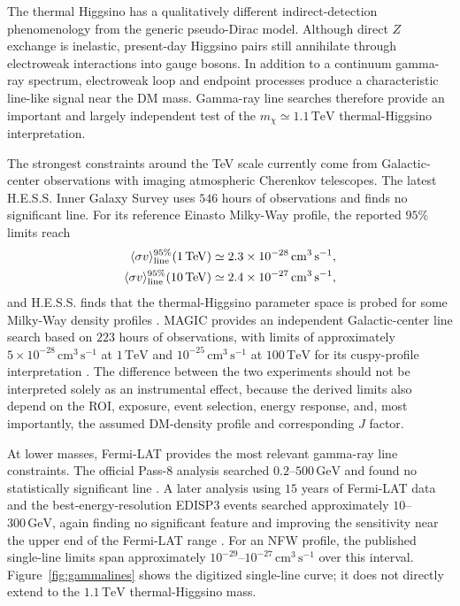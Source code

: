 \documentclass[aps,prd,reprint,superscriptaddress,nofootinbib,longbibliography,floatfix]{revtex4-2}
\newcommand{\GeV}{\mathrm{GeV}}
\newcommand{\TeV}{\mathrm{TeV}}
\begin{document}
The thermal Higgsino has a qualitatively different indirect-detection phenomenology from the generic pseudo-Dirac model. Although direct $Z$ exchange is inelastic, present-day Higgsino pairs still annihilate through electroweak interactions into gauge bosons. In addition to a continuum gamma-ray spectrum, electroweak loop and endpoint processes produce a characteristic line-like signal near the DM mass. Gamma-ray line searches therefore provide an important and largely independent test of the $m_\chi\simeq1.1\,\TeV$ thermal-Higgsino interpretation.

The strongest constraints around the TeV scale currently come from Galactic-center observations with imaging atmospheric Cherenkov telescopes. The latest H.E.S.S. Inner Galaxy Survey uses $546$ hours of observations and finds no significant line. For its reference Einasto Milky-Way profile, the reported $95\%$ limits reach
\begin{align}
\langle\sigma v\rangle_{\rm line}^{95\%}(1\,\TeV)
&\simeq2.3\times10^{-28}\,\mathrm{cm^3\,s^{-1}},\\
\langle\sigma v\rangle_{\rm line}^{95\%}(10\,\TeV)
&\simeq2.4\times10^{-27}\,\mathrm{cm^3\,s^{-1}},
\end{align}
and H.E.S.S. finds that the thermal-Higgsino parameter space is probed for some Milky-Way density profiles \cite{HESS2026}. MAGIC provides an independent Galactic-center line search based on $223$ hours of observations, with limits of approximately $5\times10^{-28}\,\mathrm{cm^3\,s^{-1}}$ at $1\,\TeV$ and $10^{-25}\,\mathrm{cm^3\,s^{-1}}$ at $100\,\TeV$ for its cuspy-profile interpretation \cite{MAGIC2023Lines}. The difference between the two experiments should not be interpreted solely as an instrumental effect, because the derived limits also depend on the ROI, exposure, event selection, energy response, and, most importantly, the assumed DM-density profile and corresponding $J$ factor.

At lower masses, Fermi-LAT provides the most relevant gamma-ray line constraints. The official Pass-8 analysis searched $0.2$--$500\,\GeV$ and found no statistically significant line \cite{FermiLAT2015Lines}. A later analysis using $15$ years of Fermi-LAT data and the best-energy-resolution EDISP3 events searched approximately $10$--$300\,\GeV$, again finding no significant feature and improving the sensitivity near the upper end of the Fermi-LAT range \cite{FermiLAT15yrLines}. For an NFW profile, the published single-line limits span approximately $10^{-29}$--$10^{-27}\,\mathrm{cm^3\,s^{-1}}$ over this interval. Figure~\ref{fig:gammalines} shows the digitized single-line curve; it does not directly extend to the $1.1\,\TeV$ thermal-Higgsino mass.
\end{document}
